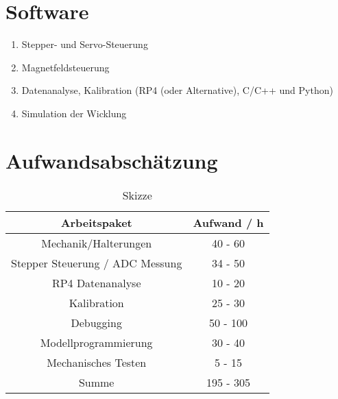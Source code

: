 \section*{Software}
\begin{enumerate}
    \item Stepper- und Servo-Steuerung
    \item Magnetfeldsteuerung
    \item Datenanalyse, Kalibration (RP4 (oder Alternative), C/C++ und Python)
    \item Simulation der Wicklung
\end{enumerate}

\section*{Aufwandsabschätzung}
\begin{table}[H]
    \centering
    \caption{
        Skizze
    }
    \begin{tabular}{| c | c |}
        \hline
        Arbeitspaket &  Aufwand / h\\
        \hline
        Mechanik/Halterungen & 40 - 60  \\
        \hline
        Stepper Steuerung / ADC Messung & 34 - 50 \\
        \hline
        RP4 Datenanalyse & 10 - 20  \\
        \hline
        Kalibration & 25 - 30 \\
        \hline
        Debugging & 50 - 100 \\
        \hline
        Modellprogrammierung & 30 - 40 \\
        \hline
        Mechanisches Testen & 5 - 15 \\
        \hline
        \hline
        Summe & 195 - 305  \\
        \hline
    \end{tabular}
    \label{tab:Aufwand}
\end{table}